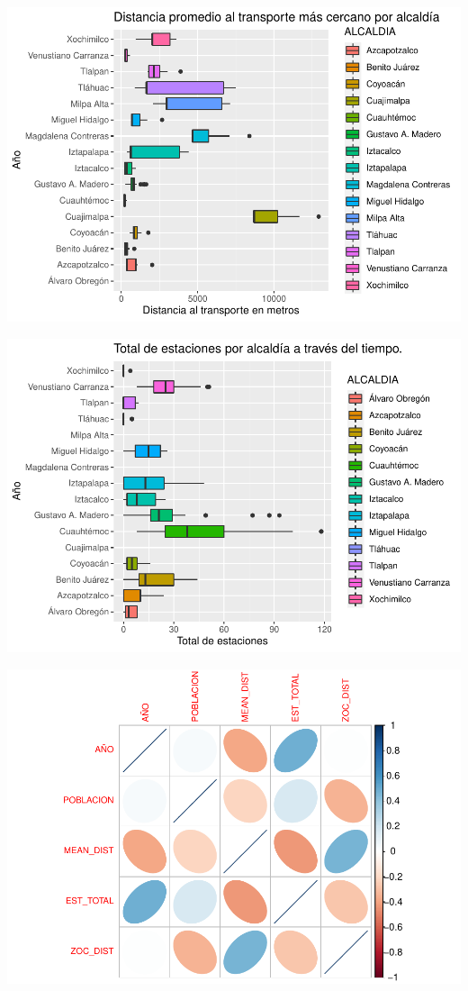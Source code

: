 \documentclass[
]{article}
\begin{document}
\begin{center}\includegraphics{proyecto_files/figure-latex/unnamed-chunk-6-1} \end{center}

\begin{center}\includegraphics{proyecto_files/figure-latex/unnamed-chunk-7-1} \end{center}

\begin{center}\includegraphics{proyecto_files/figure-latex/unnamed-chunk-8-1} \end{center}
\end{document}
